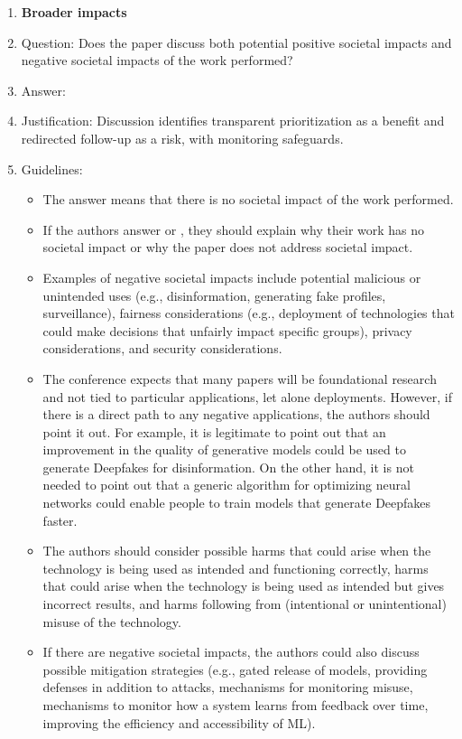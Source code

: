 \documentclass{article}
\begin{document}
\begin{enumerate}
\item {\bf Broader impacts}
    \item[] Question: Does the paper discuss both potential positive societal impacts and negative societal impacts of the work performed?
    \item[] Answer: \answerYes{}
    \item[] Justification: Discussion identifies transparent prioritization as a benefit and redirected follow-up as a risk, with monitoring safeguards.
    \item[] Guidelines:
    \begin{itemize}
        \item The answer \answerNA{} means that there is no societal impact of the work performed.
        \item If the authors answer \answerNA{} or \answerNo, they should explain why their work has no societal impact or why the paper does not address societal impact.
        \item Examples of negative societal impacts include potential malicious or unintended uses (e.g., disinformation, generating fake profiles, surveillance), fairness considerations (e.g., deployment of technologies that could make decisions that unfairly impact specific groups), privacy considerations, and security considerations.
        \item The conference expects that many papers will be foundational research and not tied to particular applications, let alone deployments. However, if there is a direct path to any negative applications, the authors should point it out. For example, it is legitimate to point out that an improvement in the quality of generative models could be used to generate Deepfakes for disinformation. On the other hand, it is not needed to point out that a generic algorithm for optimizing neural networks could enable people to train models that generate Deepfakes faster.
        \item The authors should consider possible harms that could arise when the technology is being used as intended and functioning correctly, harms that could arise when the technology is being used as intended but gives incorrect results, and harms following from (intentional or unintentional) misuse of the technology.
        \item If there are negative societal impacts, the authors could also discuss possible mitigation strategies (e.g., gated release of models, providing defenses in addition to attacks, mechanisms for monitoring misuse, mechanisms to monitor how a system learns from feedback over time, improving the efficiency and accessibility of ML).
    \end{itemize}
    

\end{enumerate}
\end{document}

